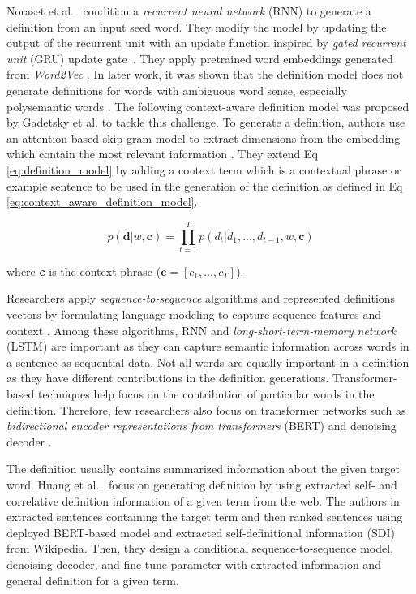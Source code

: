 Noraset et al.~\cite{noraset_definition_2016} condition a \textit{recurrent neural network} (RNN) to generate a definition from an input seed word. They modify the model by updating the output of the recurrent unit with an update
function inspired by \textit{gated recurrent unit} (GRU) update gate~\cite{noraset_definition_2016}. They apply pretrained word embeddings generated from \textit{Word2Vec} \cite{mikolov_efficient_2013}. In later
work, it was shown that the definition model does not generate definitions for words with ambiguous word sense, especially polysemantic words \cite{gadetsky_conditional_2018}. The following context-aware definition model was proposed by Gadetsky et al. \cite{gadetsky_conditional_2018} to tackle this challenge. To generate a definition, authors
use an attention-based skip-gram model to extract dimensions from the embedding which contain the most relevant information \cite{gadetsky_conditional_2018}. They extend Eq \ref{eq:definition_model} by adding a context term which is a contextual phrase or example sentence to be used in the generation of the definition as defined in Eq \ref{eq:context_aware_definition_model}.

\begin{equation}
    \label{eq:context_aware_definition_model}
    p(\textbf{d} | w, \textbf{c}) = \prod_{t=1}^{T} p(d_t | d_1,...,d_{t-1}, w, \textbf{c})
\end{equation}

\noindent
where \textbf{c} is the context phrase ($\textbf{c} = [c_1, ..., c_T]$).

Researchers apply \textit{sequence-to-sequence} algorithms and represented
definitions vectors by formulating language modeling to capture sequence
features and context \cite{bevilacqua_generationary_2020, huang_cdm_2021,
    kabiri_evaluating_2020, washio_bridging_2019, reid_vcdm_2020}. Among these
algorithms, RNN and \textit{long-short-term-memory network} (LSTM) are important
as they can capture semantic information across words in a sentence as
sequential data. Not all words are equally important in a definition as they
have different contributions in the definition generations. Transformer-based
techniques help focus on the contribution of particular words in the definition.
Therefore, few researchers also focus on transformer networks such as
\textit{bidirectional encoder representations from transformers} (BERT) and
denoising decoder \cite{devlin2018bert, lewis2019bart}.

The definition usually contains summarized information about the given target word. Huang et al.~\cite{huang_cdm_2021} focus on generating definition by using extracted self- and correlative definition information of a given term from the
web. The authors in~\cite{huang_cdm_2021} extracted sentences containing the target term and then ranked
sentences using deployed BERT-based model and extracted self-definitional information (SDI) from Wikipedia. Then, they design a conditional sequence-to-sequence model, denoising decoder, and fine-tune parameter with extracted information and general definition for a given term.

